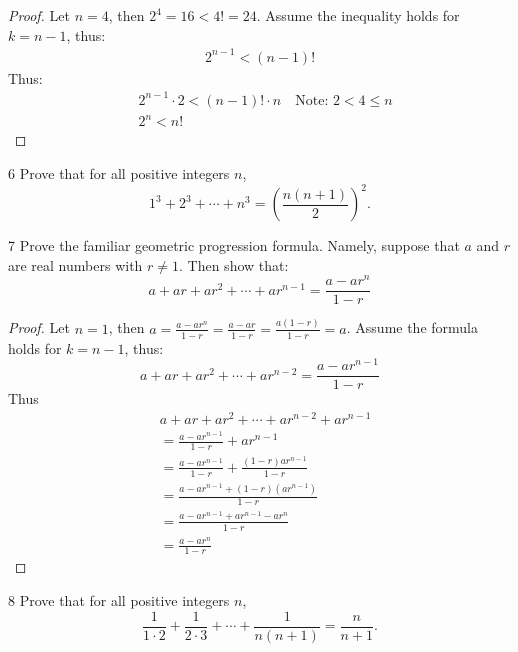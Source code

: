 \begin{proof}
    Let $n = 4$, then $2^4 = 16 < 4! = 24$.
    Assume the inequality holds for $k = n - 1$, thus:
    \begin{align*}
        2^{n - 1} < (n - 1)!
    \end{align*}
    Thus:
    \begin{align*}
         & 2^{n - 1} \cdot 2 < (n - 1)! \cdot n \quad \text{Note: $2 < 4 \le n$} \\
         & 2^n < n! 
    \end{align*}
\end{proof}

\begin{problem}{6}
    Prove that for all positive integers $n$,
    \[1^3 + 2^3 + \cdots + n^3 = {\left(\frac{n(n + 1)}{2}\right)}^2.\]
\end{problem}
\unsolved

\begin{problem}{7}
    Prove the familiar geometric progression formula.
    Namely, suppose that $a$ and $r$ are real numbers with $r \not = 1$.
    Then show that:
    \[a + ar  + ar^2 + \cdots + ar^{n - 1} = \frac{a - ar^n}{1 - r}\]
\end{problem}
\solved

\begin{proof}
    Let $n = 1$, then $a = \frac{a - ar^n}{1 - r} = \frac{a - ar}{1 - r} = \frac{a(1 - r)}{1 - r} = a$.
    Assume the formula holds for $k = n - 1$, thus:
    \[a + ar + ar^2 + \cdots + ar^{n - 2} = \frac{a - ar^{n - 1}}{1 - r}\]
    Thus
    \begin{align*}
         & a + ar + ar^2 + \cdots + ar^{n - 2} + ar^{n - 1}                \\
         & =\frac{a - ar^{n - 1}}{1 - r} + ar^{n - 1}                      \\
         & =\frac{a - ar^{n - 1}}{1 - r} + \frac{(1 - r)ar^{n - 1}}{1 - r} \\
         & =\frac{a - ar^{n - 1} + (1 - r)(ar^{n - 1})}{1 - r}             \\
         & =\frac{a - ar^{n - 1} + ar^{n - 1} - ar^n}{1 - r}               \\
         & =\frac{a - ar^n}{1 - r}
    \end{align*}
\end{proof}

\begin{problem}{8}
    Prove that for all positive integers $n$,
    \[\frac{1}{1 \cdot 2} + \frac{1}{2 \cdot 3} + \cdots + \frac{1}{n(n + 1)} = \frac{n}{n + 1}.\]
\end{problem}
\unsolved

